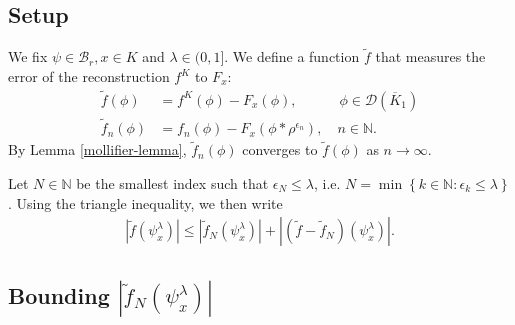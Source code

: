 \subsection*{Setup} 

We fix \(\psi \in \mathcal{B}_r, x \in K\) and \(\lambda \in (0,1]\). We define a function \(\tilde f\) that measures the error of the reconstruction \(f^K\) to \(F_x\):  
\begin{align*}
    \tilde f(\phi) &= f^K(\phi) - F_x(\phi), \quad \qquad \phi \in \mathcal{D}(\overline{K}_1)\\
    \tilde f_n(\phi) &= f_n(\phi) - F_x(\phi * \rho^{\epsilon_n}), \quad n \in \mathbb{N}.
\end{align*}
By Lemma \ref{mollifier-lemma}, \(\tilde f_n(\phi)\) converges to \(\tilde f(\phi)\) as \(n \to \infty\).

Let \(N \in \mathbb{N}\) be the smallest index such that \(\epsilon_N \leq \lambda\), i.e. \(N = \min \left\{ k \in \mathbb{N} : \epsilon_k \leq \lambda  \right\}\). Using the triangle inequality, we then write 
\begin{align*}
    |\tilde f (\psi^\lambda_x)| \leq  |\tilde f_N (\psi^\lambda_x)| + |(\tilde f - \tilde f_N) (\psi^\lambda_x)|.
\end{align*}

\subsection*{Bounding \(|\tilde f_N (\psi^\lambda_x)|\)} 

